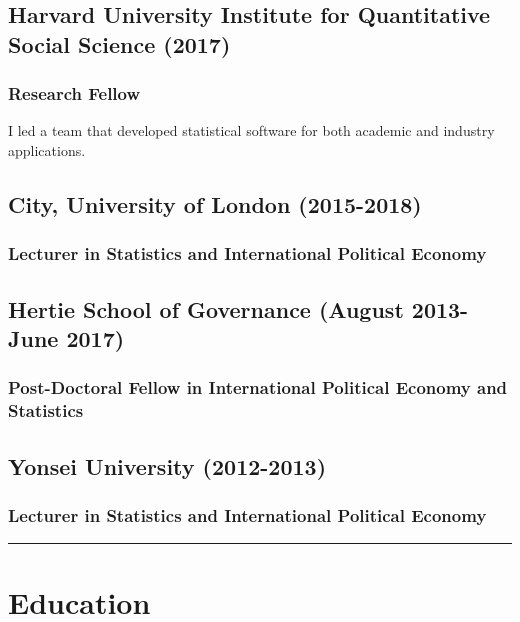 \documentclass[a4paper]{article}
\begin{document}
\subsection*{Harvard University Institute for Quantitative Social Science (2017)}

\subsubsection*{Research Fellow}

I led a team that developed statistical software for both academic and industry applications.

\subsection*{City, University of London (2015-2018)}

\subsubsection*{Lecturer in Statistics and International Political Economy}

\subsection*{Hertie School of Governance (August 2013-June 2017)}

\subsubsection*{Post-Doctoral Fellow in International Political Economy and Statistics}

\subsection*{Yonsei University (2012-2013)}

\subsubsection*{Lecturer in Statistics and International Political Economy}

\vspace{0.25cm}
\medskip\hrule height 1pt
\vspace{0.5cm}

\section*{Education}
\end{document}

